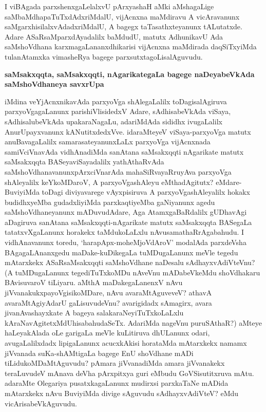 \medskip
\noindent
I viBAgada parxshenxgaLelalxvU pArxyashaH aMki aMshagaLige saMbaMdhapaTuTxdAdxriMdalU, vijAcnxna maMdi\-ravu A vicAravanunx saMgarxhisilalxvAdadxriMdalU, A bagegx taTasathxte\-yanunx tALutatxde. Adare ASaRsaMparx\-dAyadalilx baMdudU, matutx AdhunikavU Ada saMshoVdhana karxmagaLananxdhikarisi vijAcnxna maMdi\-rada daqSiTx\-yiMda tula\-nAtamxka vimasheRya bagege parxsutxtagoLisalAguvudu.

{\bigskip
\noindent
{\large\bf saMsakxqqta, saMsakxqqti, nAgarikategaLa bagege naDeyabeVkAda saMshoVdhaneya savxrUpa}}\label{page53}

\medskip
\noindent
iMdina veYjAcnxnikavAda parxyoVga shAlegaLalilx toDagisalAgiruva parxyoVga\-gaLanunx parishiVli\-sidedxV Adare, sAdhisabeVkAda viSaya, sAdhisalubeVkAda upakaraNagaLu, adariMdAda sididhx ivugaLalilx Anu\-rUpayx\-vanunx kANutitxdedxVve. idaraMteyeV viSaya\--parxyoVga matutx anuBavagaLalilx samarasateyanunxLaLx parxyoVga vijAcnx\-nada samiV\-ciVnavAda vidhAnadiMda sanAtana saMsakxqqti nAgarikate matutx saMsakxqqta BASeya\break viSayadalilx yathAthaRvAda saMshoVdhanavanunxpArxciVnarAda mahaSiRvayaRru\break yAva parxyoVga shAle\-yalilx keY\-koM\-DaroV, A parxyoVgashAleyu eMthadA\-gitutx? eMdare-BuviyiMda toDagi diviyavarege vAyxpisiruva A parxyoVga\-shAle\-yalilx hokakx budidhxyeMba gudadxliyiMda parxkaqtiyeMba gaNiyanunx agedu saMshoV\-dhane\-yanunx mADuvudAdare, Aga AtamxgaBaRdalilx gUDhavAgi aDagiruva sanAtana saMsakxqqti\--nAgari\-kate matutx saMsakxqqta BASegaLa tatatxvXgaLanunx horakekx taMdukoLaLxlu nAvu\break samathaRrAgabahudu. I vidhAna\-vanunx toredu, `harapApx-moheMjoVdAroV' modalAda parxdeVsha BAgagaLAnanxgedu maDake-kuDikegaLa tuMDu\-gaLanunx meVle tegedu mAtarxkekx ASaRsaMsakxqqti saMshoVdhane naDesalu sAdhayxvAdiVteVnu? (A tuMDu\-gaLanunx tegediTuTxkoMDu nAveVnu mADabeVkeMdu shoVdhakaru BAvisuvaroV tiLiyaru. aMthA maDake\-gaLanenxV nAvu jiVvanakukxpayoVgisikoMDare, nAvu avaraMtAgu\-veveV? athavA avaraMtAgiyAdarU gaLisuvudeVnu? avarigidadx sAmagirx, avara jivanAvashayxkate A bageya salakaraNeyiTuTxkoLaLxlu kAraNa\-vAgi\-tetxMdU\-hisabahudaSeTx. AdariMda nageVnu puruSAthaR?) aMteye haLeyakAlada oLe garigaLa meVle kuLi\-tiruva dhULanunx odari, avugaLalilxdadx lipigaLanunx acucxkAkisi horataMda mAtarxkekx namamx jiVvanada suKa-shAMtigaLa bagege EnU shoVdhane mADi tiLidukoMDaMtAguvudu? pAmara jiVvanadiMda amara jiVvanakekx teraLuvudeV mAnava deVha \hbox{pArxpitxya} guri eMbudu GoVSisutitxruva mAtu. adaraMte Ole\-gariya pusatxkagaLanunx mudirxsi parxkaTaNe mADida mAtarxkekx nAvu BuviyiMda divige sAguvudu sAdhayx\-vAdiVteV? eMdu vicArisabeVkAguvudu.


